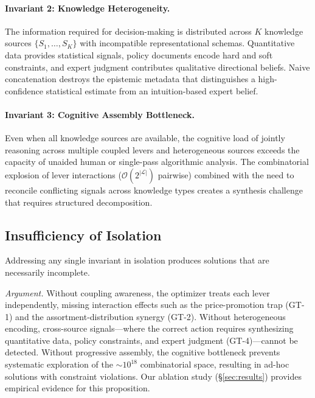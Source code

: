 \documentclass[11pt,a4paper]{article}
\begin{document}
\paragraph{Invariant 2: Knowledge Heterogeneity.}
The information required for decision-making is distributed across $K$ knowledge sources $\{S_1, \ldots, S_K\}$ with incompatible representational schemas.
Quantitative data provides statistical signals, policy documents encode hard and soft constraints, and expert judgment contributes qualitative directional beliefs.
Naive concatenation destroys the epistemic metadata that distinguishes a high-confidence statistical estimate from an intuition-based expert belief.

\paragraph{Invariant 3: Cognitive Assembly Bottleneck.}
Even when all knowledge sources are available, the cognitive load of jointly reasoning across multiple coupled levers and heterogeneous sources exceeds the capacity of unaided human or single-pass algorithmic analysis.
The combinatorial explosion of lever interactions ($\mathcal{O}(2^{|\mathcal{L}|})$ pairwise) combined with the need to reconcile conflicting signals across knowledge types creates a synthesis challenge that requires structured decomposition.

\subsection{Insufficiency of Isolation}

\begin{proposition}
Addressing any single invariant in isolation produces solutions that are necessarily incomplete.
\end{proposition}

\textit{Argument.}
Without coupling awareness, the optimizer treats each lever independently, missing interaction effects such as the price-promotion trap (GT-1) and the assortment-distribution synergy (GT-2).
Without heterogeneous encoding, cross-source signals---where the correct action requires synthesizing quantitative data, policy constraints, and expert judgment (GT-4)---cannot be detected.
Without progressive assembly, the cognitive bottleneck prevents systematic exploration of the ${\sim}10^{18}$ combinatorial space, resulting in ad-hoc solutions with constraint violations.
Our ablation study (\S\ref{sec:results}) provides empirical evidence for this proposition.
\end{document}
